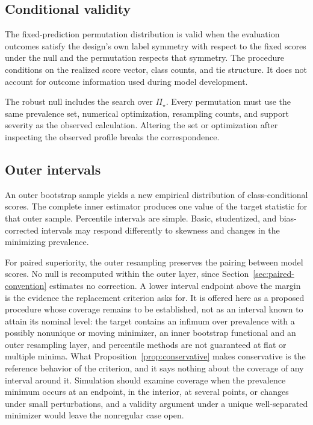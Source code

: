 \documentclass[11pt]{article}
\newcommand{\PSet}{\Pi_\star}
\theoremstyle{remark}
\begin{document}
\subsection{Conditional validity}

The fixed-prediction permutation distribution is valid when the evaluation outcomes satisfy the design's own label symmetry with respect to the fixed scores under the null and the permutation respects that symmetry. The procedure conditions on the realized score vector, class counts, and tie structure. It does not account for outcome information used during model development.

The robust null includes the search over $\PSet$. Every permutation must use the same prevalence set, numerical optimization, resampling counts, and support severity as the observed calculation. Altering the set or optimization after inspecting the observed profile breaks the correspondence.

\subsection{Outer intervals}

An outer bootstrap sample yields a new empirical distribution of class-conditional scores. The complete inner estimator produces one value of the target statistic for that outer sample. Percentile intervals are simple. Basic, studentized, and bias-corrected intervals may respond differently to skewness and changes in the minimizing prevalence.

For paired superiority, the outer resampling preserves the pairing between model scores. No null is recomputed within the outer layer, since Section~\ref{sec:paired-convention} estimates no correction. A lower interval endpoint above the margin is the evidence the replacement criterion asks for. It is offered here as a proposed procedure whose coverage remains to be established, not as an interval known to attain its nominal level: the target contains an infimum over prevalence with a possibly nonunique or moving minimizer, an inner bootstrap functional and an outer resampling layer, and percentile methods are not guaranteed at flat or multiple minima. What Proposition~\ref{prop:conservative} makes conservative is the reference behavior of the criterion, and it says nothing about the coverage of any interval around it. Simulation should examine coverage when the prevalence minimum occurs at an endpoint, in the interior, at several points, or changes under small perturbations, and a validity argument under a unique well-separated minimizer would leave the nonregular case open.
\end{document}
